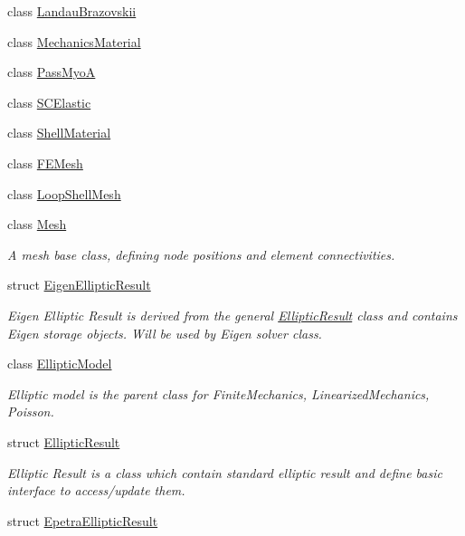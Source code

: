 \begin{DoxyCompactItemize}
\item 
class \hyperlink{classvoom_1_1_landau_brazovskii}{LandauBrazovskii}
\item 
class \hyperlink{classvoom_1_1_mechanics_material}{MechanicsMaterial}
\item 
class \hyperlink{classvoom_1_1_pass_myo_a}{PassMyoA}
\item 
class \hyperlink{classvoom_1_1_s_c_elastic}{SCElastic}
\item 
class \hyperlink{classvoom_1_1_shell_material}{ShellMaterial}
\item 
class \hyperlink{classvoom_1_1_f_e_mesh}{FEMesh}
\item 
class \hyperlink{classvoom_1_1_loop_shell_mesh}{LoopShellMesh}
\item 
class \hyperlink{classvoom_1_1_mesh}{Mesh}
\begin{DoxyCompactList}\small\item\em A mesh base class, defining node positions and element connectivities. \item\end{DoxyCompactList}\item 
struct \hyperlink{structvoom_1_1_eigen_elliptic_result}{EigenEllipticResult}
\begin{DoxyCompactList}\small\item\em Eigen Elliptic Result is derived from the general \hyperlink{structvoom_1_1_elliptic_result}{EllipticResult} class and contains Eigen storage objects. Will be used by Eigen solver class. \item\end{DoxyCompactList}\item 
class \hyperlink{classvoom_1_1_elliptic_model}{EllipticModel}
\begin{DoxyCompactList}\small\item\em Elliptic model is the parent class for FiniteMechanics, LinearizedMechanics, Poisson. \item\end{DoxyCompactList}\item 
struct \hyperlink{structvoom_1_1_elliptic_result}{EllipticResult}
\begin{DoxyCompactList}\small\item\em Elliptic Result is a class which contain standard elliptic result and define basic interface to access/update them. \item\end{DoxyCompactList}\item 
struct \hyperlink{structvoom_1_1_epetra_elliptic_result}{EpetraEllipticResult}

\end{DoxyCompactItemize}
